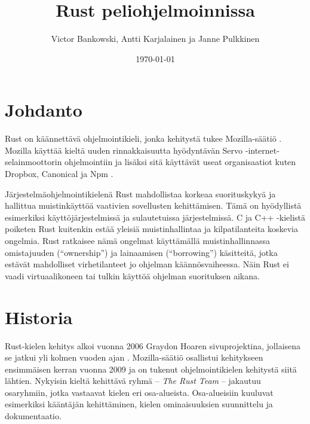 \documentclass[finnish]{tktltiki2}
\title{Rust peliohjelmoinnissa}
\author{Victor Bankowski, Antti Karjalainen ja Janne Pulkkinen}
\date{\today}
\theoremstyle{definition}
\theoremstyle{remark}
\begin{document}

\frontmatter      %

\maketitle        %
\makeabstract     %

\tableofcontents  %


\mainmatter       %

\section{Johdanto}

Rust on käännettävä ohjelmointikieli, jonka kehitystä tukee Mozilla-säätiö \cite{servo}. Mozilla käyttää kieltä uuden rinnakkaisuutta hyödyntävän Servo -internet-selainmoottorin ohjelmointiin ja lisäksi sitä käyttävät useat organisaatiot kuten Dropbox, Canonical ja Npm \cite{RustFriends}.

Järjestelmäohjelmointikielenä Rust mahdollistaa korkeaa suorituskykyä ja hallittua muistinkäyttöä vaativien sovellusten kehittämisen. Tämä on hyödyllistä esimerkiksi käyttöjärjestelmissä ja sulautetuissa järjestelmissä. C ja C++ -kielistä poiketen Rust kuitenkin estää yleisiä muistinhallintaa ja kilpatilanteita koskevia ongelmia. Rust ratkaisee nämä ongelmat käyttämällä muistinhallinnassa omistajuuden (“ownership”) ja lainaamisen (“borrowing”) käsitteitä, jotka estävät mahdolliset virhetilanteet jo ohjelman käännösvaiheessa. Näin Rust ei vaadi virtuaalikoneen tai tulkin käyttöä ohjelman suorituksen aikana.

\section{Historia}

Rust-kielen kehitys alkoi vuonna 2006 Graydon Hoaren sivuprojektina, jollaisena se jatkui yli kolmen vuoden ajan \cite{RustFaq}. Mozilla-säätiö osallistui kehitykseen ensimmäisen kerran vuonna 2009 ja on tukenut ohjelmointikielen kehitystä siitä lähtien. Nykyisin kieltä kehittävä ryhmä -- \textit{The Rust Team} -- jakautuu osaryhmiin, jotka vastaavat kielen eri osa-alueista. Osa-alueisiin kuuluvat esimerkiksi kääntäjän kehittäminen, kielen ominaisuuksien suunnittelu ja dokumentaatio.
\end{document}
